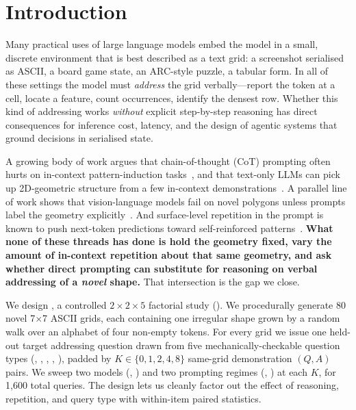 \section{Introduction}
\label{sec:intro}

Many practical uses of large language models embed the model in a small,
discrete environment that is best described as a text grid: a screenshot
serialised as ASCII, a board game state, an ARC-style puzzle, a tabular
form. In all of these settings the model must \emph{address} the grid
verbally---report the token at a cell, locate a feature, count
occurrences, identify the densest row. Whether this kind of addressing
works \emph{without} explicit step-by-step reasoning has direct
consequences for inference cost, latency, and the design of agentic
systems that ground decisions in serialised state.

A growing body of work argues that chain-of-thought (CoT) prompting often
hurts on in-context pattern-induction tasks~\citep{zheng2025curse,
sprague2025tocot}, and that text-only LLMs can pick up 2D-geometric
structure from a few in-context demonstrations~\citep{liu2025sparks}. A
parallel line of work shows that vision-language models fail on novel
polygons unless prompts label the geometry
explicitly~\citep{rudman2025polygons,wang2025vdlm}. And surface-level
repetition in the prompt is known to push next-token predictions toward
self-reinforced patterns~\citep{yan2024repetitions}. {\bf What none of
these threads has done is hold the geometry fixed, vary the amount of
in-context repetition about that same geometry, and ask whether direct
prompting can substitute for reasoning on verbal addressing of a
\emph{novel} shape.} That intersection is the gap we close.

 We design \addrtask, a controlled
$2{\times}2{\times}5$ factorial study (). We
procedurally generate 80 novel 7$\times$7 ASCII grids, each containing
one irregular shape grown by a random walk over an alphabet of four
non-empty tokens. For every grid we issue one held-out
target addressing question drawn from five mechanically-checkable
question types (\qpoint, \qlookup, \qcount, \qrowmax, \qneighbor), padded
by $K \in \{0,1,2,4,8\}$ same-grid demonstration $(Q,A)$ pairs. We sweep
two models (\gpt, \haiku) and two prompting regimes (\Direct, \COT) at
each $K$, for 1{,}600 total queries. The design lets us cleanly factor
out the effect of reasoning, repetition, and query type with
within-item paired statistics.

